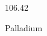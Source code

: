 \documentclass[12pt]{article}
\begin{document}
\hfill{}
\vfill
\begin{center}
  {\fontsize{50}{60}
  }

  \vspace{1em}

  106.42

Palladium
\end{center}
\vfill
\end{document}
